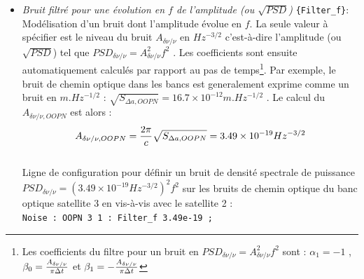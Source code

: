 \documentclass[a4paper,english,12pt]{article}
\begin{document}
\begin{itemize}
\item { \it Bruit filtr\'e pour une \'evolution en $f$ de l'amplitude (ou $\sqrt{PSD}$)} \texttt{\{Filter\_f\}}: Mod\'elisation d'un bruit dont l'amplitude \'evolue en $f$. La seule valeur \`a sp\'ecifier est le niveau du bruit $A_{\delta \nu / \nu}$ en $Hz^{-3/2}$ c'est-\`a-dire l'amplitude (ou $\sqrt{PSD}$) tel que $PSD_{\delta \nu / \nu} = A^2_{\delta \nu / \nu} f^{2}$ . Les coefficients sont ensuite automatiquement calcul\'es par rapport au pas de temps\footnote{Les coefficients du filtre pour un bruit en $PSD_{\delta \nu / \nu} = A^2_{\delta \nu / \nu} f^{2}$ sont : $\alpha_{1} = -1$ , $\beta_{0} = {A_{\delta \nu / \nu} \over \pi \Delta t} $ et  $\beta_{1} = - {A_{\delta \nu / \nu} \over \pi \Delta t} $ }.
Par exemple, le bruit de chemin optique dans les bancs est generalement exprime comme un bruit  en $m.Hz^{-1/2}$ : $\sqrt{S_{\Delta a , OOPN }} = 16.7 \times 10^{-12} m.Hz^{-1/2}$ . Le calcul du $A_{\delta \nu / \nu , OOPN}$ est alors : 
\begin{equation}
A_{\delta \nu / \nu , OOPN} = {2 \pi \over  c} \sqrt{S_{\Delta a , OOPN}} = 3.49 \times 10^{-19} Hz^{-3/2}
\end{equation}\\
Ligne de configuration pour d\'efinir un bruit de densit\'e spectrale de puissance $PSD_{\delta \nu / \nu} = \left( 3.49 \times 10^{-19} Hz^{-3/2} \right)^2 f^{2}$ sur les bruits de chemin optique du banc optique satellite 3 en vis-\`a-vis avec le satellite 2 : \\
\hphantom{aaaaa}\texttt{Noise : OOPN 3 1 : Filter\_f 3.49e-19 ;} \\


\end{itemize}
\end{document}
